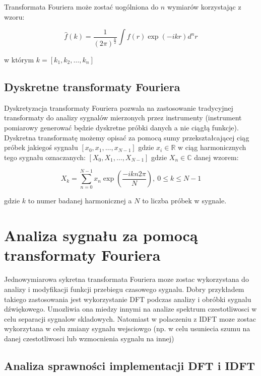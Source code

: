 \documentclass{artikel3}
\begin{document}
Transformata Fouriera może zostać uogólniona do $n$ wymiarów korzystając z wzoru:

\begin{equation}
    \hat{f}(k) = \frac{1}{{(2\pi)}^\frac{n}{2}} \int f(r) \exp{(-ikr)} d^n r
\end{equation}

w którym $k=[k_1,k_2,\ldots, k_n]$

\subsection*{Dyskretne transformaty Fouriera}
Dyskretyzacja transformaty Fouriera pozwala na zastosowanie tradycyjnej transformaty do analizy sygnalów mierzonych przez instrumenty (instrument pomiarowy generować będzie dyskretne próbki danych a nie ciągłą funkcje).
Dyskretna transformatę możemy opisać za pomocą sumy przekształcającej ciąg próbek jakiegoś sygnału $[x_0, x_1, \ldots, x_{N-1}]$ gdzie $x_i \in \mathbb{R}$ w ciąg harmonicznych tego sygnału oznaczanych: $[X_0, X_1, \ldots, X_{N-1}]$ gdzie $X_n \in \mathbb{C}$ danej wzorem:

\begin{equation}
    X_k = \sum_{n=0}^{N-1} x_n \exp{\left(\frac{-i k n 2\pi}{N}\right)} , \ 0 \le k \le N - 1
\end{equation}

gdzie $k$ to numer badanej harmonicznej a $N$ to liczba próbek w sygnale.

\section{Analiza sygnału za pomocą transformaty Fouriera}

Jednowymiarowa sykretna transformata Fouriera moze zostac wykorzystana do analizy i modyfikacji funkcji przebiegu czasowego sygnalu.
Dobry przykładem takiego zastosowania jest wykorzystanie DFT podczas analizy i obróbki sygnalu dźwiękowego.
Umozliwia ona miedzy innymi na analize spektrum czestotliwosci w celu separacji sygnalow skladowych. Natomiast w polaczeniu z IDFT moze zostac wykorzytana w celu zmiany sygnalu wejsciowgo (np. w celu usuniecia szumu na danej czestotliwosci lub wzmocnienia sygnalu na innej)

\subsection{Analiza sprawności implementacji DFT i IDFT }
\end{document}
